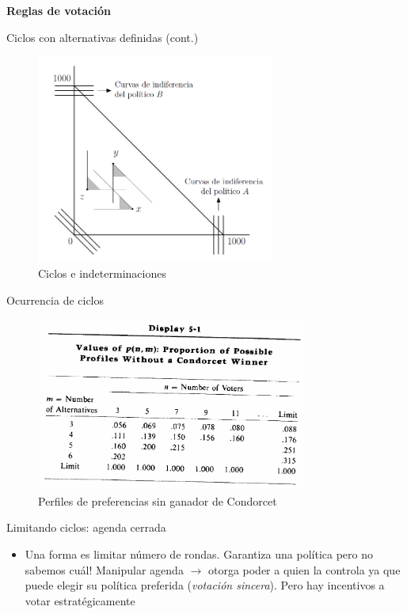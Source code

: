 \documentclass[
  ignorenonframetext,
]{beamer}
\providecommand{\tightlist}{%
  \setlength{\itemsep}{0pt}\setlength{\parskip}{0pt}}\usepackage{longtable,booktabs,array}
\begin{document}
\begin{frame}{\textbf{Reglas de votación}}
\begin{block}{Ciclos con alternativas definidas (cont.)}
\begin{figure}
{\centering \includegraphics[width=0.7\textwidth,height=\textheight]{../epol/fig/fig-02-014.png}

}

\caption{Ciclos e indeterminaciones}

\end{figure}
\end{block}

\begin{block}{Ocurrencia de ciclos}
\protect\hypertarget{ocurrencia-de-ciclos}{}
\begin{figure}

{\centering \includegraphics[width=0.8\textwidth,height=\textheight]{../epol/fig/fig-02-015.png}

}

\caption{Perfiles de preferencias sin ganador de Condorcet}

\end{figure}
\end{block}

\begin{block}{Limitando ciclos: agenda cerrada}
\protect\hypertarget{limitando-ciclos-agenda-cerrada}{}
\begin{itemize}
\tightlist
\item
  Una forma es limitar número de rondas. Garantiza una política pero no
  sabemos cuál! Manipular agenda \(\longrightarrow\) otorga poder a
  quien la controla ya que puede elegir su política preferida
  (\emph{votación sincera}). Pero hay incentivos a votar
  estratégicamente


\end{itemize}
\end{block}
\end{frame}
\end{document}
